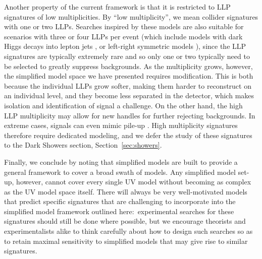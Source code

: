 Another property of the current framework is that it is restricted to LLP signatures of low multiplicities. By ``low multiplicity'', we mean collider signatures with one or two LLPs. Searches inspired by these models are also suitable for scenarios with three or four LLPs per event (which include models with dark Higgs decays into lepton jets \cite{Falkowski:2010cm}, or left-right symmetric models \cite{Nemevsek:2016enw}), since the LLP signatures are typically extremely rare and so only one or two typically need to be selected to greatly suppress backgrounds. As the multiplicity grows, however, the simplified model space we have presented requires modification. This is both because the individual LLPs grow softer, making them harder to reconstruct on an individual level, and they become less separated in the detector, which makes isolation and identification of signal a challenge. On the other hand, the high LLP multiplicity may allow for new handles for further rejecting backgrounds. In extreme cases, signals can even mimic pile-up \cite{Knapen:2016hky}. High multiplicity signatures therefore require dedicated modeling, and we defer the study of these signatures to the Dark Showers section, Section~\ref{sec:showers}.

Finally, we conclude by noting that simplified models are built to provide a general framework to cover a broad swath of models. Any simplified model set-up, however, cannot cover every single UV model without becoming as complex as the UV model space itself. There will always be very well-motivated models that predict specific signatures that are challenging to incorporate into the simplified model framework outlined here:~experimental searches for these signatures should still be done where possible, but we encourage theorists and experimentalists alike to think carefully about how to design such searches so as to retain maximal sensitivity to simplified models that may give rise to similar signatures.
